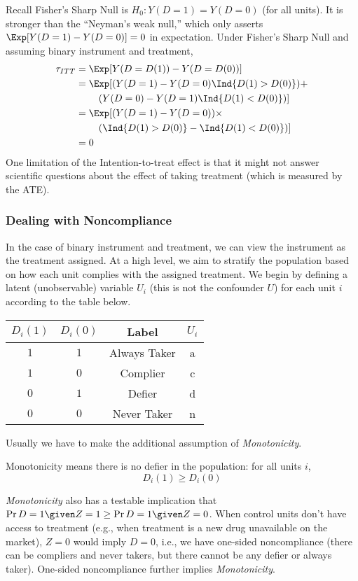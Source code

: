 Recall Fisher's Sharp Null is \(H_0: Y(D = 1) = Y(D = 0)\) (for all units). It is stronger than the ``Neyman's weak null,'' which only asserts $\Exp[Y(D = 1) - Y(D = 0)] = 0$ in expectation. Under Fisher's Sharp Null and assuming binary instrument and treatment,
\begin{align*}
    \tau_{ITT} &= \Exp[Y(D = D(1)) - Y(D = D(0))] \\
    &= \Exp[(Y(D = 1) - Y(D = 0) \Ind\{D(1) > D(0)\}) + \\
    &~~~~~~~(Y(D = 0) - Y(D = 1) \Ind\{D(1) < D(0)\})] \\ 
    &= \Exp[(Y(D = 1) - Y(D = 0)) \times \\
    &~~~~~~~(\Ind\{D(1) > D(0)\} - \Ind\{D(1) < D(0)\})] \\
    &= 0
\end{align*}
One limitation of the Intention-to-treat effect is that it might not answer scientific questions about the effect of taking treatment (which is measured by the ATE). 

\subsubsection{Dealing with Noncompliance}
In the case of binary instrument and treatment, we can view the instrument as the treatment assigned. At a high level, we aim to stratify the population based on how each unit complies with the assigned treatment. We begin by defining a latent (unobservable) variable \(U_i\) (this is not the confounder \(U\)) for each unit \(i\) according to the table below. 

\begin{table}[h]
    \centering
    \begin{tabular}{|c|c|c|c|}
        \hline
        \(D_i(1)\) & \(D_i(0)\) & Label & \(U_i\) \\
        \hline
        \( 1 \) & \( 1 \) & Always Taker & a \\
        \( 1 \) & \( 0 \) & Complier & c \\
        \( 0 \) & \( 1 \) & Defier & d \\
        \( 0 \) & \( 0 \) & Never Taker & n \\
        \hline
    \end{tabular}
\end{table}

Usually we have to make the additional assumption of \textit{Monotonicity}.
\begin{assumption}
    Monotonicity means there is no defier in the population: for all units \(i\), \[D_i(1) \geq D_i(0)\]
\end{assumption}
\textit{Monotonicity} also has a testable implication that \(\Pr{D = 1 \given Z = 1} \geq \Pr{D = 1 \given Z = 0}\). When control units don't have access to treatment (e.g., when treatment is a new drug unavailable on the market), \(Z = 0\) would imply \(D = 0\), i.e., we have one-sided noncompliance (there can be compliers and never takers, but there cannot be any defier or always taker). One-sided noncompliance further implies \textit{Monotonicity}.

